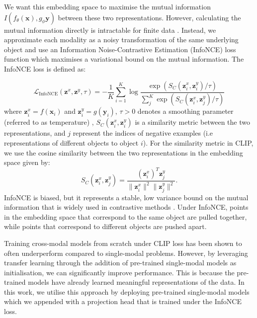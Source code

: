 \documentclass[a4paper,12pt]{article}
\begin{document}
We want this embedding space to maximise the mutual information $I(f_{\theta}(\mathbf{x}),g_\phi{\mathbf{y}})$ between these two representations. However, calculating the mutual information directly is intractable for finite data \cite{mutualinfolimitation}. Instead, we approximate each modality as a noisy transformation of the same underlying object and use an Information Noise-Contrastive Estimation (InfoNCE) loss function \cite{infonce} which maximises a variational bound on the mutual information. The InfoNCE loss is defined as:

\begin{equation}
    \mathcal{L}_{\text{InfoNCE}}(\mathbf{z}^x, \mathbf{z}^y, \tau) = -\frac{1}{K} \sum_{i=1}^{K} \log \frac{\exp\left(S_C(\mathbf{z}^x_i, \mathbf{z}^y_i)/\tau\right)}{\sum_{j}^{K} \exp\left(S_C(\mathbf{z}^x_i, \mathbf{z}^y_j)/\tau\right)}
    \label{eq:infonce}
\end{equation}
where $\mathbf{z}^x_i=f(\mathbf{x}_i)$ and $\mathbf{z}^y_i=g(\mathbf{y}_i)$, $\tau > 0$ denotes a smoothing parameter (referred to as temperature) , $S_C(\mathbf{z}^x_i, \mathbf{z}^y_i)$ is a similarity metric between the two representations, and $j$ represent the indices of negative examples (i.e representations of different objects to object $i$). For the similarity metric in CLIP, we use the cosine similarity between the two representations in the embedding space given by:
\begin{equation}
    S_C(\mathbf{z}^x_i, \mathbf{z}^y_j) = \frac{(\mathbf{z}^x_i)^T \mathbf{z}^y_j}{\|\mathbf{z}^x_i\|^2 \|\mathbf{z}^y_j\|^2}.
    \label{eq:cosine}
\end{equation}
InfoNCE is biased, but it represents a stable, low variance bound on the mutual information that is widely used in contrastive methods \cite{crossCLIP}. Under InfoNCE, points in the embedding space that correspond to the same object are pulled together, while points that correspond to different objects are pushed apart.

Training cross-modal models from scratch under CLIP loss has been shown to often underperform compared to single-modal problems. However, by leveraging transfer learning through the addition of pre-trained single-modal models as initialisation, we can significantly improve performance. This is because the pre-trained models have already learned meaningful representations of the data. In this work, we utilise this approach by deploying pre-trained single-modal models which we appended with a projection head that is trained under the InfoNCE loss. 
\end{document}
